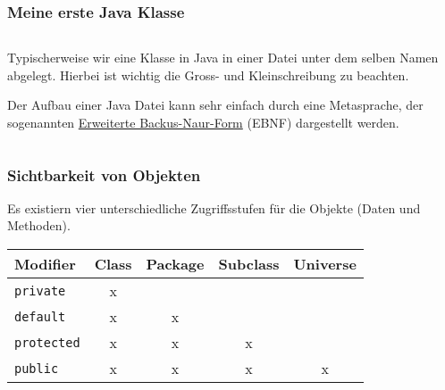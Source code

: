 \begin{frame}[fragile]
    \frametitle<presentation>{Meine erste Java Klasse}

    \inputminted[frame=single,samepage]{java}{../java/academy/HelloWorld.java}

\end{frame}

\mode*
{}

Typischerweise wir eine Klasse in Java in einer Datei unter dem selben Namen abgelegt.
Hierbei ist wichtig die Gross- und Kleinschreibung zu beachten.



Der Aufbau einer Java Datei kann sehr einfach durch eine Metasprache, der sogenannten
\href{https://de.wikipedia.org/wiki/Erweiterte_Backus-Naur-Form}{Erweiterte Backus-Naur-Form}
(EBNF) dargestellt werden.

\inputminted[firstline=41,lastline=46]{antlr}{Java.g4}



\begin{frame}[fragile]
    \frametitle<presentation>{Sichtbarkeit von Objekten}

    Es existiern vier unterschiedliche Zugriffsstufen für die
    Objekte (Daten und Methoden).
    
    \begin{table}[ht]
        \centering
        \begin{tabular}{p{3cm}|c|c|c|c}
            Modifier                     & Class & Package & Subclass & Universe \\ \hline
            \texttt{private}   &  x    &         &          &          \\
            \texttt{default}             &  x    &    x    &          &          \\
            \texttt{protected} &  x    &    x    &     x    &          \\
            \texttt{public}    &  x    &    x    &     x    &    x
        \end{tabular}
    \end{table}

\end{frame}


